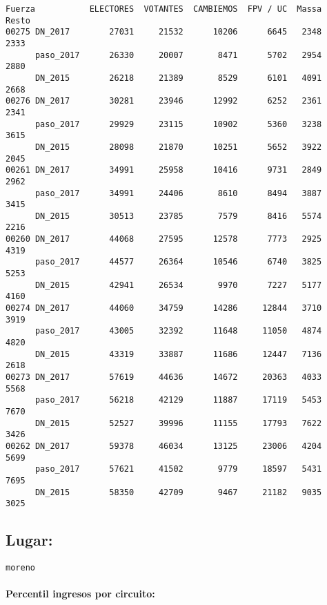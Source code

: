 \documentclass[11pt]{article}
\begin{document}
    \begin{verbatim}
Fuerza           ELECTORES  VOTANTES  CAMBIEMOS  FPV / UC  Massa  Resto
00275 DN_2017        27031     21532      10206      6645   2348   2333
      paso_2017      26330     20007       8471      5702   2954   2880
      DN_2015        26218     21389       8529      6101   4091   2668
00276 DN_2017        30281     23946      12992      6252   2361   2341
      paso_2017      29929     23115      10902      5360   3238   3615
      DN_2015        28098     21870      10251      5652   3922   2045
00261 DN_2017        34991     25958      10416      9731   2849   2962
      paso_2017      34991     24406       8610      8494   3887   3415
      DN_2015        30513     23785       7579      8416   5574   2216
00260 DN_2017        44068     27595      12578      7773   2925   4319
      paso_2017      44577     26364      10546      6740   3825   5253
      DN_2015        42941     26534       9970      7227   5177   4160
00274 DN_2017        44060     34759      14286     12844   3710   3919
      paso_2017      43005     32392      11648     11050   4874   4820
      DN_2015        43319     33887      11686     12447   7136   2618
00273 DN_2017        57619     44636      14672     20363   4033   5568
      paso_2017      56218     42129      11887     17119   5453   7670
      DN_2015        52527     39996      11155     17793   7622   3426
00262 DN_2017        59378     46034      13125     23006   4204   5699
      paso_2017      57621     41502       9779     18597   5431   7695
      DN_2015        58350     42709       9467     21182   9035   3025
    \end{verbatim}

    
    \hypertarget{lugar}{%
\subsection{Lugar:}\label{lugar}}

    
    \begin{Verbatim}[commandchars=\\\{\}]
moreno

    \end{Verbatim}

    \hypertarget{percentil-ingresos-por-circuito}{%
\paragraph{Percentil ingresos por
circuito:}\label{percentil-ingresos-por-circuito}}
\end{document}
